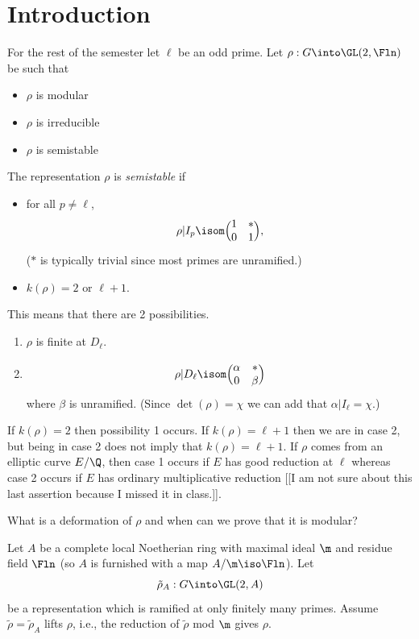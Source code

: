 \documentclass{report}
\begin{document}
\section{Introduction}
For the rest of the semester let $\ell$ be an odd prime.
Let $\rho:G\into\GL(2,\Fln)$ be such that
\begin{itemize}
\item $\rho$ is modular
\item $\rho$ is irreducible
\item $\rho$ is semistable
\end{itemize}
\begin{defn}The representation $\rho$ is {\em semistable} if
\begin{itemize}
\item for all $p\neq\ell$,
$$\rho|I_p\isom\Bigl(\begin{matrix}1&*\\0&1\end{matrix}\Bigr),$$
($*$ is typically trivial since most primes are unramified.)
\item $k(\rho)=2\text{ or }\ell+1$.
\end{itemize}
\end{defn}
This means that there are 2 possibilities.
\begin{enumerate}
\item $\rho$ is finite at $D_{\ell}$.
\item $$\rho|D_{\ell}\isom
       \Bigl(\begin{matrix}\alpha&*\\0&\beta\end{matrix}\Bigr)$$
where $\beta$ is unramified. (Since $\det(\rho)=\chi$ we can add
that $\alpha|I_{\ell}=\chi$.)
\end{enumerate}
If $k(\rho)=2$ then possibility 1 occurs. If $k(\rho)=\ell+1$ then
we are in case 2, but being in case 2 does not imply that $k(\rho)=\ell+1$.
If $\rho$ comes from an elliptic curve $E/\Q$, then case 1 occurs if
$E$ has good reduction at $\ell$ whereas case 2 occurs if $E$ has
ordinary multiplicative reduction [[I am not sure about this last
assertion because I missed it in class.]].

What is a deformation of $\rho$ and when can we prove that it is modular?

Let $A$ be a complete local Noetherian ring with maximal ideal
$\m$ and residue field $\Fln$ (so $A$ is furnished with a map
$A/\m\iso\Fln$). Let
$$\tilde{\rho}_A:G\into\GL(2,A)$$
be a representation which is ramified at only finitely many primes.
Assume $\tilde{\rho}=\tilde{\rho}_A$ lifts $\rho$, i.e., the reduction of
$\tilde{\rho}$ mod $\m$ gives $\rho$.
\end{document}
